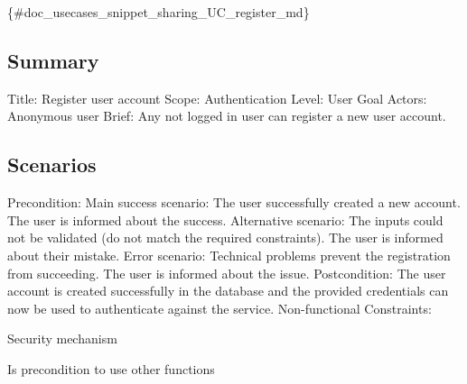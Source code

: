 \{\#doc\+\_\+usecases\+\_\+snippet\+\_\+sharing\+\_\+\+U\+C\+\_\+register\+\_\+md\}

\subsection*{Summary}

Title\+: Register user account Scope\+: Authentication Level\+: User Goal Actors\+: Anonymous user Brief\+: Any not logged in user can register a new user account.

\subsection*{Scenarios}

Precondition\+: Main success scenario\+: The user successfully created a new account. The user is informed about the success. Alternative scenario\+: The inputs could not be validated (do not match the required constraints). The user is informed about their mistake. Error scenario\+: Technical problems prevent the registration from succeeding. The user is informed about the issue. Postcondition\+: The user account is created successfully in the database and the provided credentials can now be used to authenticate against the service. Non-\/functional Constraints\+:
\begin{DoxyItemize}
\item Security mechanism
\item Is precondition to use other functions 
\end{DoxyItemize}